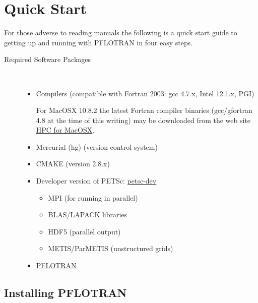 \section{Quick Start}

For those adverse to reading manuals the following is a quick start guide to getting up and running with PFLOTRAN in four easy steps.

\begin{description}
\item[Required Software Packages] ~
\begin{itemize}
\item Compilers (compatible with Fortran 2003: gcc 4.7.x, Intel 12.1.x, PGI)

For MacOSX 10.8.2 the latest Fortran compiler binaries (gcc/gfortran 4.8 at the time of this writing) may be downloaded from the web site \href{http://hpc.sourceforge.net}{HPC for MacOSX}.


\item Mercurial (hg) (version control system)
\item CMAKE (version 2.8.x)
\item Developer version of PETSc: \href{http://www.mcs.anl.gov/petsc/developers/index.html}{petsc-dev}
\begin{itemize}
\item MPI (for running in parallel)
\item BLAS/LAPACK libraries
\item HDF5 (parallel output)
\item METIS/ParMETIS (unstructured grids)
\end{itemize}
\item \href{https://bitbucket.org/pflotran/pflotran-dev}{PFLOTRAN}
\end{itemize}
\end{description}

\subsection{Installing PFLOTRAN}

